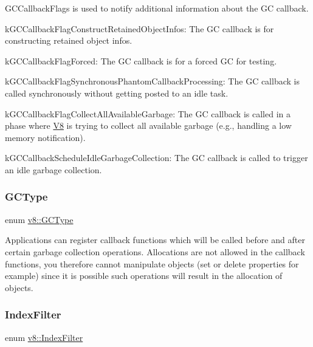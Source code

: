 G\+C\+Callback\+Flags is used to notify additional information about the GC callback.
\begin{DoxyItemize}
\item k\+G\+C\+Callback\+Flag\+Construct\+Retained\+Object\+Infos\+: The GC callback is for constructing retained object infos.
\item k\+G\+C\+Callback\+Flag\+Forced\+: The GC callback is for a forced GC for testing.
\item k\+G\+C\+Callback\+Flag\+Synchronous\+Phantom\+Callback\+Processing\+: The GC callback is called synchronously without getting posted to an idle task.
\item k\+G\+C\+Callback\+Flag\+Collect\+All\+Available\+Garbage\+: The GC callback is called in a phase where \mbox{\hyperlink{classv8_1_1V8}{V8}} is trying to collect all available garbage (e.\+g., handling a low memory notification).
\item k\+G\+C\+Callback\+Schedule\+Idle\+Garbage\+Collection\+: The GC callback is called to trigger an idle garbage collection. 
\end{DoxyItemize}\mbox{\label{namespacev8_ac109d6f27e0c0f9ef4e98bcf7a806cf2}} 
\subsubsection{\texorpdfstring{G\+C\+Type}{GCType}}
{\footnotesize\ttfamily enum \mbox{\hyperlink{namespacev8_ac109d6f27e0c0f9ef4e98bcf7a806cf2}{v8\+::\+G\+C\+Type}}}

Applications can register callback functions which will be called before and after certain garbage collection operations. Allocations are not allowed in the callback functions, you therefore cannot manipulate objects (set or delete properties for example) since it is possible such operations will result in the allocation of objects. \mbox{\label{namespacev8_a46fd71fef702b35b34ed7495e7a63323}} 
\subsubsection{\texorpdfstring{Index\+Filter}{IndexFilter}}
{\footnotesize\ttfamily enum \mbox{\hyperlink{namespacev8_a46fd71fef702b35b34ed7495e7a63323}{v8\+::\+Index\+Filter}}\hspace{0.3cm}{\ttfamily [strong]}}

